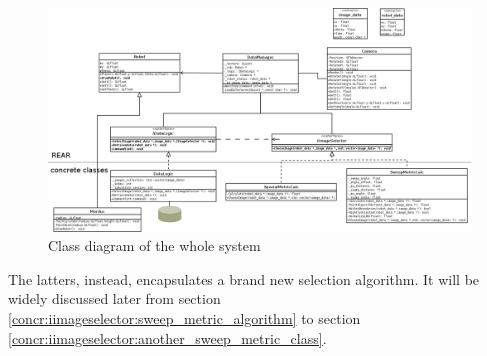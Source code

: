 {
\begin{figure}[!h]
  \begin{center}
    \includegraphics[width=\textheight, angle=90]{img/class_diagram.png} 
    \caption{Class diagram of the whole system}
    \label{fig:class_diagram_complete}
  \end{center}
\end{figure}
}


The latters, instead, encapsulates a brand new selection algorithm. 
It will be widely discussed later from section
\ref{concr:iimageselector:sweep_metric_algorithm} to section
\ref{concr:iimageselector:another_sweep_metric_class}.

\clearpage

\clearpage

\clearpage

